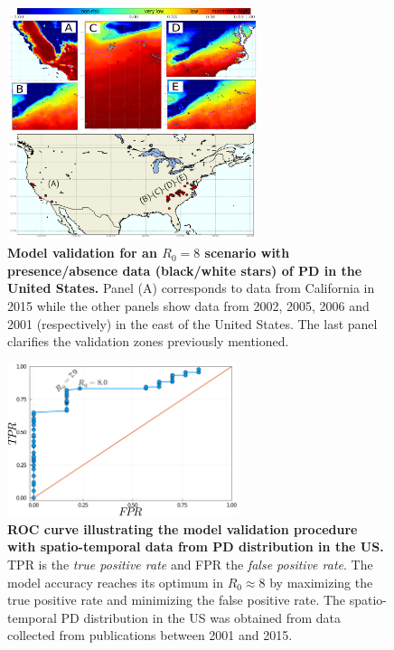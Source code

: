 \begin{figure}[H]
    \centering
    \includegraphics[width=0.65\textwidth]{Figures/validation.png}
    \caption[Model validation with PD presence/absence data]{\textbf{Model
            validation for an $R_0=8$ scenario with
            presence/absence data (black/white stars) of PD in the United
            States.} Panel
        (A) corresponds to data from California in 2015 while the other
        panels
        show
        data from 2002, 2005, 2006 and 2001 (respectively) in the east of
        the
        United
        States. The last panel clarifies the validation zones previously
        mentioned.}
    \label{fig:sup_validation} %
\end{figure}

\begin{figure}[H]
    \centering
    \includegraphics[width=0.6\textwidth]{Figures/ROC_curve.png}
    \caption[ROC curve illustrating the model validation procedure]{\textbf{ROC
            curve illustrating the model validation procedure
            with spatio-temporal data from PD distribution in the US.} TPR
        is
        the
        \textit{true positive rate} and FPR the \textit{false positive
            rate}.
        The model
        accuracy reaches its optimum in $R_0\approx8$ by maximizing the
        true
        positive
        rate and minimizing the false positive rate. The spatio-temporal PD
        distribution
        in the US was obtained from data collected from publications
        between
        2001 and
        2015.}
    \label{fig:sup_ROC} %
\end{figure}

